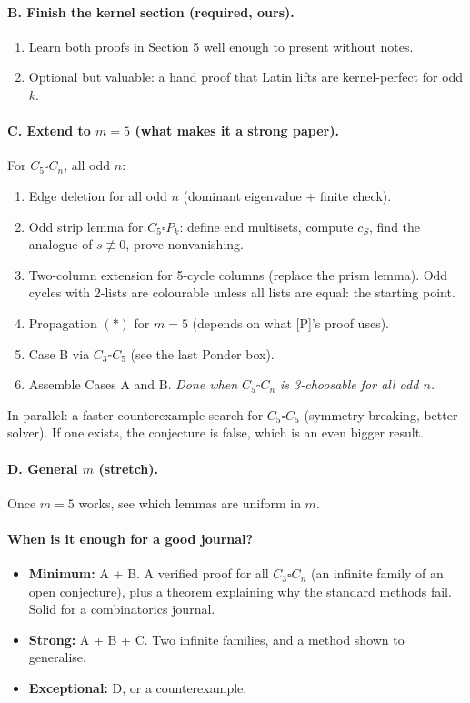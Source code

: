 \documentclass[11pt]{article}
\theoremstyle{plain}
\theoremstyle{definition}
\newcommand{\T}{\square}
\begin{document}
\paragraph{B. Finish the kernel section (required, ours).}
\begin{enumerate}[nosep]
\item Learn both proofs in Section 5 well enough to present without notes.
\item Optional but valuable: a hand proof that Latin lifts are kernel-perfect for odd $k$.
\end{enumerate}

\paragraph{C. Extend to $m=5$ (what makes it a strong paper).} For $C_5\T C_n$, all odd $n$:
\begin{enumerate}[nosep]
\item Edge deletion for all odd $n$ (dominant eigenvalue + finite check).
\item Odd strip lemma for $C_5\T P_k$: define end multisets, compute $c_S$, find the analogue
of $s\not\equiv0$, prove nonvanishing.
\item Two-column extension for 5-cycle columns (replace the prism lemma). Odd cycles with
2-lists are colourable unless all lists are equal: the starting point.
\item Propagation $(\ast)$ for $m=5$ (depends on what [P]'s proof uses).
\item Case B via $C_3\T C_5$ (see the last Ponder box).
\item Assemble Cases A and B. \emph{Done when $C_5\T C_n$ is 3-choosable for all odd $n$.}
\end{enumerate}
In parallel: a faster counterexample search for $C_5\T C_5$ (symmetry breaking, better
solver). If one exists, the conjecture is false, which is an even bigger result.

\paragraph{D. General $m$ (stretch).} Once $m=5$ works, see which lemmas are uniform in $m$.

\paragraph{When is it enough for a good journal?}
\begin{itemize}[nosep]
\item \textbf{Minimum:} A + B. A verified proof for all $C_3\T C_n$ (an infinite family of an
open conjecture), plus a theorem explaining why the standard methods fail. Solid for a
combinatorics journal.
\item \textbf{Strong:} A + B + C. Two infinite families, and a method shown to generalise.
\item \textbf{Exceptional:} D, or a counterexample.
\end{itemize}
\end{document}
